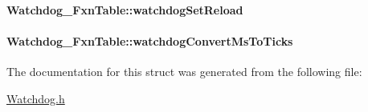 \paragraph[{watchdog\+Set\+Reload}]{ Watchdog\+\_\+\+Fxn\+Table\+::watchdog\+Set\+Reload}\label{struct_watchdog___fxn_table_aff9226f8aff3780cf4a05d3e0adf7ea4}
\paragraph[{watchdog\+Convert\+Ms\+To\+Ticks}]{ Watchdog\+\_\+\+Fxn\+Table\+::watchdog\+Convert\+Ms\+To\+Ticks}\label{struct_watchdog___fxn_table_ab253c59bdf8e993393478369de95a038}


The documentation for this struct was generated from the following file\+:\begin{DoxyCompactItemize}
\item 
\hyperlink{_watchdog_8h}{Watchdog.\+h}\end{DoxyCompactItemize}
